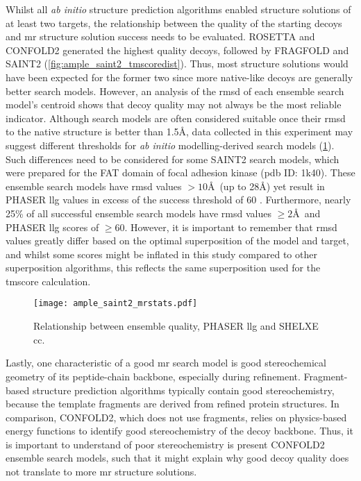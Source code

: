 Whilst all \textit{ab initio} structure prediction algorithms enabled structure solutions of at least two targets, the relationship between the quality of the starting decoys and \gls{mr} structure solution success needs to be evaluated. ROSETTA and CONFOLD2 generated the highest quality decoys, followed by FRAGFOLD and SAINT2 (\cref{fig:ample_saint2_tmscoredist}). Thus, most structure solutions would have been expected for the former two since more native-like decoys are generally better search models. However, an analysis of the \gls{rmsd} of each ensemble search model's centroid shows that decoy quality may not always be the most reliable indicator. Although search models are often considered suitable once their \gls{rmsd} to the native structure is better than 1.5\AA, data collected in this experiment may suggest different thresholds for \textit{ab initio} modelling-derived search models (\cref{fig:ample_saint2_mrstats}). Such differences need to be considered for some SAINT2 search models, which were prepared for the FAT domain of focal adhesion kinase (\gls{pdb} ID: 1k40). These ensemble search models have \gls{rmsd} values $>10$\AA\ (up to 28\AA) yet result in PHASER \gls{llg} values in excess of the success threshold of 60 \cite{Oeffner2018-ur}. Furthermore, nearly 25\% of all successful ensemble search models have \gls{rmsd} values $\geq2$\AA\ and PHASER \gls{llg} scores of $\geq$60. However, it is important to remember that \gls{rmsd} values greatly differ based on the optimal superposition of the model and target, and whilst some scores might be inflated in this study compared to other superposition algorithms, this reflects the same superposition used for the \gls{tmscore} calculation.

\begin{figure}[H]
    \centering
    \texttt{[image: ample\_saint2\_mrstats.pdf]}
    \caption{Relationship between ensemble quality, PHASER \gls{llg} and SHELXE \gls{cc}.}
    \label{fig:ample_saint2_mrstats}
\end{figure}

Lastly, one characteristic of a good \gls{mr} search model is good stereochemical geometry of its peptide-chain backbone, especially during refinement. Fragment-based structure prediction algorithms typically contain good stereochemistry, because the template fragments are derived from refined protein structures. In comparison, CONFOLD2, which does not use fragments, relies on physics-based energy functions to identify good stereochemistry of the decoy backbone. Thus, it is important to understand of poor stereochemistry is present CONFOLD2 ensemble search models, such that it might explain why good decoy quality does not translate to more \gls{mr} structure solutions.

